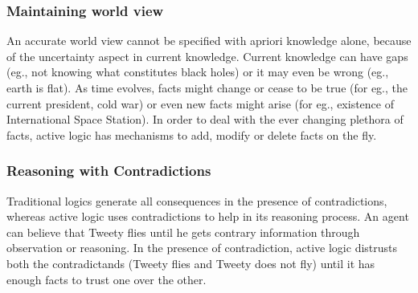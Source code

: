 \subsubsection{Maintaining world view}
An accurate world view cannot be specified with apriori knowledge
alone, because of the uncertainty aspect in current knowledge. Current knowledge
can have gaps (eg., not knowing what constitutes black holes) or it may even be wrong (eg., earth is flat).  As time evolves, 
facts might change or cease to be true (for eg., the current
president, cold war) or even new facts might arise (for eg., existence of
International Space Station).  In order to deal with the ever changing
plethora of facts, active logic has mechanisms to add, modify or
delete facts on the fly.

\subsubsection{Reasoning with Contradictions}
Traditional logics generate all consequences in the presence of
contradictions, whereas active logic uses contradictions to help in
its reasoning 
process. An agent can believe that Tweety flies until he gets contrary
information through observation or reasoning. In the presence of
contradiction, active logic distrusts both the contradictands (Tweety
flies and Tweety does not fly) until it has enough facts to
trust one over the other.






